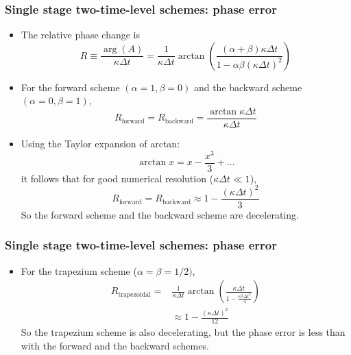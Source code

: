 \documentclass[aspectratio=149,9pt]{beamer}
\begin{document}
%
%
%
\begin{frame}
	\frametitle{Single stage two-time-level schemes: phase error}
	\begin{itemize}
		\item The relative phase change is
			\begin{equation*}
				R \equiv \frac{\arg(A)}{\kappa\Delta t}=
				\frac{1}{\kappa \Delta t} \arctan \left( \frac{\left(\alpha +\beta \right) \kappa  \Delta t}
					{1 - \alpha \beta \left( \kappa \Delta t\right)^2} \right)
			\end{equation*}
		\item For the forward scheme $(\alpha=1, \beta=0)$ and the backward scheme $(\alpha=0, \beta=1)$,
			\begin{equation*}
				R_\text{forward} = R_\text{backward} = \frac{\arctan \kappa \Delta t}{\kappa \Delta t}
			\end{equation*}
		\item Using the Taylor expansion of arctan:
			\begin{equation*}
				\arctan x = x -\frac{x^3}{3} + \dots
			\end{equation*}
			it follows that for good numerical resolution ($\kappa\Delta t \ll 1$),
			\begin{equation*}
				R_\text{forward} = R_\text{backward} \approx 1 - \frac{\left( \kappa \Delta t \right)^2}{3}
			\end{equation*}
			So the forward scheme and the backward scheme are decelerating.
	\end{itemize}
\end{frame}
%
%
%
\begin{frame}
	\frametitle{Single stage two-time-level schemes: phase error}
	\begin{itemize}
		\item For the trapezium scheme ($\alpha=\beta=1/2)$,
		\begin{align*}
			R_\text{trapezoidal} =& \frac{1}{\kappa \Delta t} \arctan \left(\frac{\kappa \Delta t}{1 - \frac{\kappa^2 \Delta t^2}{4}}\right) \\
			&\approx 1 - \frac{\left(\kappa \Delta t\right)^2}{12}
		\end{align*}
		So the trapezium scheme is also decelerating, but the phase error is less than with the forward and the backward schemes.
	\end{itemize}
%
\end{frame}
\end{document}
